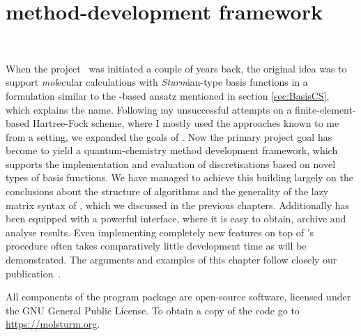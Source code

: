 \chapter{\molsturm method-development framework}
\label{ch:Molsturm}
 \\


\noindent
When the \molsturm project~\cite{molsturmWeb} was initiated a couple of years back,
the original idea was to support \textit{mol}ecular calculations
with \textit{Sturm}ian-type basis functions
in a formulation similar to the \contraction-based ansatz mentioned in section \ref{sec:BasisCS},
which explains the name.
Following my unsuccessful attempts on a finite-element-based Hartree-Fock scheme,
where I mostly used the approaches known to me from a \cGTO setting,
we expanded the goals of \molsturm.
Now the primary project goal has become to yield a quantum-chemistry
method development framework,
which supports the implementation and evaluation
of discretisations based on novel types of basis functions.
We have managed to achieve this
building largely on the conclusions
about the structure of \SCF algorithms
and the generality of the lazy matrix syntax of \lazyten,
which we discussed in the previous chapters.
Additionally \molsturm has been equipped with a powerful \python interface,
where it is easy to obtain, archive and analyse results.
Even implementing completely new features on top of \molsturm's \SCF procedure
often takes comparatively little development time as will be demonstrated.
The arguments and examples of this chapter follow
closely our publication~\cite{molsturmDesign}.

All components of the \molsturm program package
are open-source software, licensed under the GNU General Public License.
To obtain a copy of the code go to \url{https://molsturm.org}.





